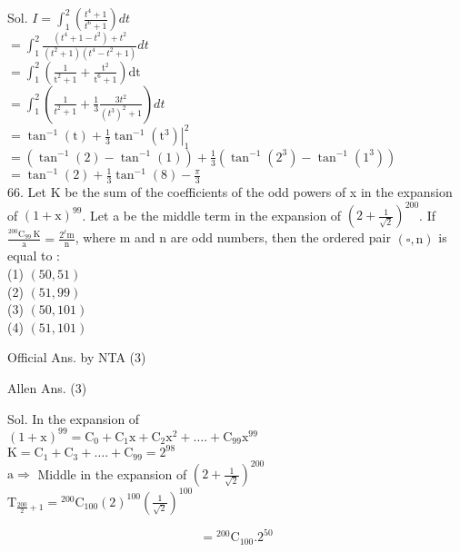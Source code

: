 \documentclass[10pt]{article}
\begin{document}
Sol. \(I=\int_{1}^{2}\left(\frac{t^{4}+1}{t^{6}+1}\right) d t\)\\
\(=\int_{1}^{2} \frac{\left(t^{4}+1-t^{2}\right)+t^{2}}{\left(t^{2}+1\right)\left(t^{4}-t^{2}+1\right)} d t\)\\
\(=\int_{1}^{2}\left(\frac{1}{\mathrm{t}^{2}+1}+\frac{\mathrm{t}^{2}}{\mathrm{t}^{6}+1}\right) \mathrm{dt}\)\\
\(=\int_{1}^{2}\left(\frac{1}{t^{2}+1}+\frac{1}{3} \frac{3 t^{2}}{\left(t^{3}\right)^{2}+1}\right) d t\)\\
\(=\tan ^{-1}(\mathrm{t})+\left.\frac{1}{3} \tan ^{-1}\left(\mathrm{t}^{3}\right)\right|_{1} ^{2}\)\\
\(=\left(\tan ^{-1}(2)-\tan ^{-1}(1)\right)+\frac{1}{3}\left(\tan ^{-1}\left(2^{3}\right)-\tan ^{-1}\left(1^{3}\right)\right)\)\\
\(=\tan ^{-1}(2)+\frac{1}{3} \tan ^{-1}(8)-\frac{\pi}{3}\)\\
66. Let K be the sum of the coefficients of the odd powers of x in the expansion of \((1+\mathrm{x})^{99}\). Let a be the middle term in the expansion of \(\left(2+\frac{1}{\sqrt{2}}\right)^{200}\). If \(\frac{{ }^{200} \mathrm{C}_{99} \mathrm{~K}}{\mathrm{a}}=\frac{2^{\ell} \mathrm{m}}{\mathrm{n}}\), where m and n are odd numbers, then the ordered pair \((\square, \mathrm{n})\) is equal to :\\
(1) \((50,51)\)\\
(2) \((51,99)\)\\
(3) \((50,101)\)\\
(4) \((51,101)\)

Official Ans. by NTA (3)

Allen Ans. (3)

Sol. In the expansion of\\
\((1+\mathrm{x})^{99}=\mathrm{C}_{0}+\mathrm{C}_{1} \mathrm{x}+\mathrm{C}_{2} \mathrm{x}^{2}+\ldots .+\mathrm{C}_{99} \mathrm{x}^{99}\)\\
\(\mathrm{K}=\mathrm{C}_{1}+\mathrm{C}_{3}+\ldots .+\mathrm{C}_{99}=2^{98}\)\\
\(\mathrm{a} \Rightarrow\) Middle in the expansion of \(\left(2+\frac{1}{\sqrt{2}}\right)^{200}\)\\
\(\mathrm{T}_{\frac{200}{2}+1}={ }^{200} \mathrm{C}_{100}(2)^{100}\left(\frac{1}{\sqrt{2}}\right)^{100}\)

\[
={ }^{200} \mathrm{C}_{100} .2^{50}
\]
\end{document}
